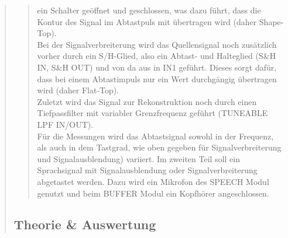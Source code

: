 \begin{quote}
\begin{quote}
     ein Schalter geöffnet und geschlossen, was dazu führt, dass die Kontur
     des Signal im Abtastpuls mit übertragen wird (daher Shape-Top).\\
     Bei der Signalverbreiterung wird das Quellensignal noch zusätzlich vorher
     durch ein S/H-Glied, also ein Abtast- und Halteglied (S&H
     IN, S&H OUT) und von da aus in IN1 geführt. Dieses sorgt dafür, dass bei
     einem Abtastimpuls nur ein Wert durchgängig übertragen wird (daher
     Flat-Top).\\ 
     \noindent\hspace*{4mm}%
     Zuletzt wird das Signal zur Rekonstruktion noch durch einen Tiefpassfilter
     mit variabler Grenzfrequenz geführt (TUNEABLE LPF IN/OUT).\\
     \noindent\hspace*{4mm}%
     Für die Messungen wird das Abtastsignal sowohl in der Frequenz, als auch in
     dem Tastgrad, wie oben gegeben für Signalverbreiterung und
     Signalausblendung) variiert.
     Im zweiten Teil soll ein Sprachsignal mit Signalausblendung oder
     Signalverbreiterung abgetastet werden. Dazu wird ein Mikrofon des SPEECH
     Modul genutzt und beim BUFFER Modul ein Kopfhörer angeschlossen.
    \end{quote}
    
    
    \subsection{Theorie \& Auswertung}
    \begin{quote}
     
    \end{quote}
    
\end{quote}









%     
%         

% 
% 
% 



